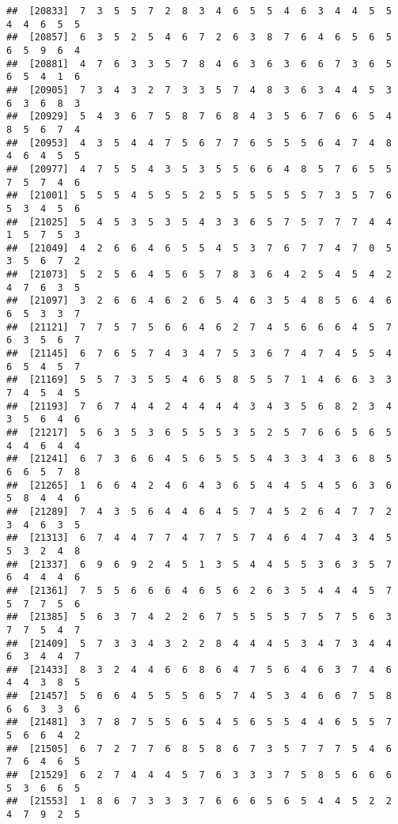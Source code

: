 \documentclass[
]{book}
\begin{document}
\begin{verbatim}
##  [20833]  7  3  5  5  7  2  8  3  4  6  5  5  4  6  3  4  4  5  5  4  4  6  5  5
##  [20857]  6  3  5  2  5  4  6  7  2  6  3  8  7  6  4  6  5  6  5  6  5  9  6  4
##  [20881]  4  7  6  3  3  5  7  8  4  6  3  6  3  6  6  7  3  6  5  6  5  4  1  6
##  [20905]  7  3  4  3  2  7  3  3  5  7  4  8  3  6  3  4  4  5  3  6  3  6  8  3
##  [20929]  5  4  3  6  7  5  8  7  6  8  4  3  5  6  7  6  6  5  4  8  5  6  7  4
##  [20953]  4  3  5  4  4  7  5  6  7  7  6  5  5  5  6  4  7  4  8  4  6  4  5  5
##  [20977]  4  7  5  5  4  3  5  3  5  5  6  6  4  8  5  7  6  5  5  7  5  7  4  6
##  [21001]  5  5  5  4  5  5  5  2  5  5  5  5  5  5  7  3  5  7  6  5  3  4  5  6
##  [21025]  5  4  5  3  5  3  5  4  3  3  6  5  7  5  7  7  7  4  4  1  5  7  5  3
##  [21049]  4  2  6  6  4  6  5  5  4  5  3  7  6  7  7  4  7  0  5  3  5  6  7  2
##  [21073]  5  2  5  6  4  5  6  5  7  8  3  6  4  2  5  4  5  4  2  4  7  6  3  5
##  [21097]  3  2  6  6  4  6  2  6  5  4  6  3  5  4  8  5  6  4  6  6  5  3  3  7
##  [21121]  7  7  5  7  5  6  6  4  6  2  7  4  5  6  6  6  4  5  7  6  3  5  6  7
##  [21145]  6  7  6  5  7  4  3  4  7  5  3  6  7  4  7  4  5  5  4  6  5  4  5  7
##  [21169]  5  5  7  3  5  5  4  6  5  8  5  5  7  1  4  6  6  3  3  7  4  5  4  5
##  [21193]  7  6  7  4  4  2  4  4  4  4  3  4  3  5  6  8  2  3  4  3  5  6  4  6
##  [21217]  5  6  3  5  3  6  5  5  5  3  5  2  5  7  6  6  5  6  5  4  4  6  4  4
##  [21241]  6  7  3  6  6  4  5  6  5  5  5  4  3  3  4  3  6  8  5  6  6  5  7  8
##  [21265]  1  6  6  4  2  4  6  4  3  6  5  4  4  5  4  5  6  3  6  5  8  4  4  6
##  [21289]  7  4  3  5  6  4  4  6  4  5  7  4  5  2  6  4  7  7  2  3  4  6  3  5
##  [21313]  6  7  4  4  7  7  4  7  7  5  7  4  6  4  7  4  3  4  5  5  3  2  4  8
##  [21337]  6  9  6  9  2  4  5  1  3  5  4  4  5  5  3  6  3  5  7  6  4  4  4  6
##  [21361]  7  5  5  6  6  6  4  6  5  6  2  6  3  5  4  4  4  5  7  5  7  7  5  6
##  [21385]  5  6  3  7  4  2  2  6  7  5  5  5  5  7  5  7  5  6  3  7  7  5  4  7
##  [21409]  5  7  3  3  4  3  2  2  8  4  4  4  5  3  4  7  3  4  4  6  3  4  4  7
##  [21433]  8  3  2  4  4  6  6  8  6  4  7  5  6  4  6  3  7  4  6  4  4  3  8  5
##  [21457]  5  6  6  4  5  5  5  6  5  7  4  5  3  4  6  6  7  5  8  6  6  3  3  6
##  [21481]  3  7  8  7  5  5  6  5  4  5  6  5  5  4  4  6  5  5  7  5  6  6  4  2
##  [21505]  6  7  2  7  7  6  8  5  8  6  7  3  5  7  7  7  5  4  6  7  6  4  6  5
##  [21529]  6  2  7  4  4  4  5  7  6  3  3  3  7  5  8  5  6  6  6  5  3  6  6  5
##  [21553]  1  8  6  7  3  3  3  7  6  6  6  5  6  5  4  4  5  2  2  4  7  9  2  5

\end{verbatim}
\end{document}

